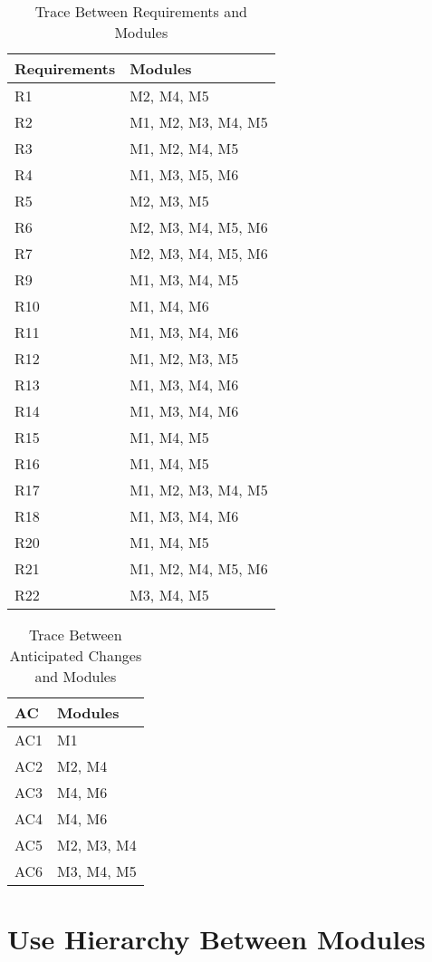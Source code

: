 \documentclass[12pt,letterpaper]{article}
\begin{document}
\begin{table}[h!]
\centering
\begin{tabular}{p{} p{}}
\toprule
\textbf{Requirements} & \textbf{Modules}\\
\midrule
{R1} & M2, M4, M5 \\
{R2} & M1, M2, M3, M4, M5 \\
{R3} & M1, M2, M4, M5 \\
{R4} & M1, M3, M5, M6 \\
{R5} & M2, M3, M5 \\
{R6} & M2, M3, M4, M5, M6 \\
{R7} & M2, M3, M4, M5, M6 \\
{R9} & M1, M3, M4, M5 \\
{R10} & M1, M4, M6\\
{R11} & M1, M3, M4, M6\\
{R12} & M1, M2, M3, M5\\
{R13} & M1, M3, M4, M6\\
{R14} & M1, M3, M4, M6\\
{R15} & M1, M4, M5\\
{R16} & M1, M4, M5\\
{R17} & M1, M2, M3, M4, M5\\
{R18} & M1, M3, M4, M6\\
{R20} & M1, M4, M5\\
{R21} & M1, M2, M4, M5, M6\\
{R22} & M3, M4, M5\\
\bottomrule
\end{tabular}
\caption{Trace Between Requirements and Modules}
\label{TblRT}
\end{table}
\begin{table}[h!]
\centering
\begin{tabular}{p{} p{}}
\toprule
\textbf{AC} & \textbf{Modules}\\
\midrule
{AC1} & M1 \\
{AC2} & M2, M4 \\
{AC3} & M4, M6 \\
{AC4} & M4,  M6 \\
{AC5} & M2, M3, M4 \\
{AC6} & M3, M4, M5 \\
\bottomrule
\end{tabular}
\caption{Trace Between Anticipated Changes and Modules}
\label{TblACT}
\end{table}
\clearpage
	\section{Use Hierarchy Between Modules}
\end{document}
